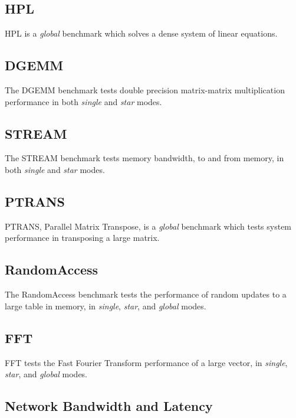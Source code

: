 \documentclass{report}
\begin{document}
%
%
\subsection{HPL}

HPL is a \emph{global} benchmark which solves a dense system of linear equations.


%
%
\subsection{DGEMM}

The DGEMM benchmark tests double precision matrix-matrix multiplication performance in both \emph{single} and \emph{star} modes.

 
%
%
\subsection{STREAM}

The STREAM benchmark tests memory bandwidth, to and from memory, in both \emph{single} and \emph{star} modes.


%
%
\subsection{PTRANS}

PTRANS, Parallel Matrix Transpose, is a \emph{global} benchmark which tests system performance in transposing a large matrix.


%
%
\subsection{RandomAccess}

The RandomAccess benchmark tests the performance of random updates to a large table in memory, in \emph{single}, \emph{star}, and \emph{global} modes.


%
%
\subsection{FFT}

FFT tests the Fast Fourier Transform performance of a large vector, in \emph{single}, \emph{star}, and \emph{global} modes.


%
%
\subsection{Network Bandwidth and Latency}
\end{document}
